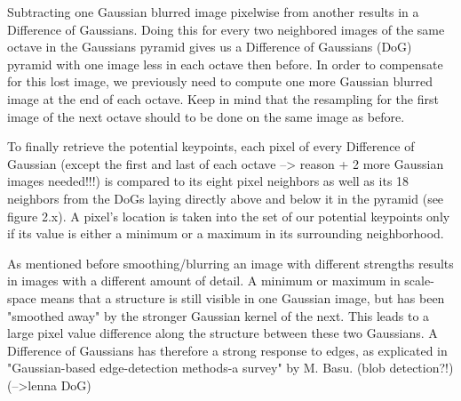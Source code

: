 \documentclass{article}
\begin{document}
	Subtracting one Gaussian blurred image pixelwise from another results in a Difference of Gaussians. Doing this for every two neighbored images of the same octave in the Gaussians pyramid gives us a Difference of Gaussians (DoG) pyramid with one image less in each octave then before. In order to compensate for this lost image, we previously need to compute one more Gaussian blurred image at the end of each octave. Keep in mind that the resampling for the first image of the next octave should to be done on the same image as before.
	
	To finally retrieve the potential keypoints, each pixel of every Difference of Gaussian (except the first and last of each octave --> reason + 2 more Gaussian images needed!!!) is compared to its eight pixel neighbors as well as its 18 neighbors from the DoGs laying directly above and below it in the pyramid (see figure 2.x). A pixel's location is taken into the set of our potential keypoints only if its value is either a minimum or a maximum in its surrounding neighborhood. 
	
	As mentioned before smoothing/blurring an image with different strengths results in images with a different amount of detail. A minimum or maximum in scale-space means that a structure is still visible in one Gaussian image, but has been "smoothed away" by the stronger Gaussian kernel of the next. This leads to a large pixel value difference along the structure between these two Gaussians. A Difference of Gaussians has therefore a strong response to edges, as explicated in "Gaussian-based edge-detection methods-a survey" by M. Basu.
	(blob detection?!)
	(-->lenna DoG)
	
\end{document}
